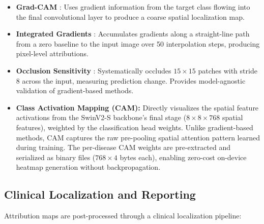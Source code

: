 \documentclass[12pt,a4paper]{report}
\begin{document}
\begin{itemize}
    \item \textbf{Grad-CAM} \cite{selvaraju2017gradcam}: Uses gradient information from the target class flowing into the final convolutional layer to produce a coarse spatial localization map.
    
    \item \textbf{Integrated Gradients} \cite{sundararajan2017axiomatic}: Accumulates gradients along a straight-line path from a zero baseline to the input image over 50 interpolation steps, producing pixel-level attributions.
    
    \item \textbf{Occlusion Sensitivity} \cite{zeiler2014visualizing}: Systematically occludes $15 \times 15$ patches with stride 8 across the input, measuring prediction change. Provides model-agnostic validation of gradient-based methods.
    
    \item \textbf{Class Activation Mapping (CAM):} Directly visualizes the spatial feature activations from the SwinV2-S backbone's final stage ($8 \times 8 \times 768$ spatial features), weighted by the classification head weights. Unlike gradient-based methods, CAM captures the raw pre-pooling spatial attention pattern learned during training. The per-disease CAM weights are pre-extracted and serialized as binary files ($768 \times 4$ bytes each), enabling zero-cost on-device heatmap generation without backpropagation.
\end{itemize}

\subsection{Clinical Localization and Reporting}

Attribution maps are post-processed through a clinical localization pipeline:
\end{document}
